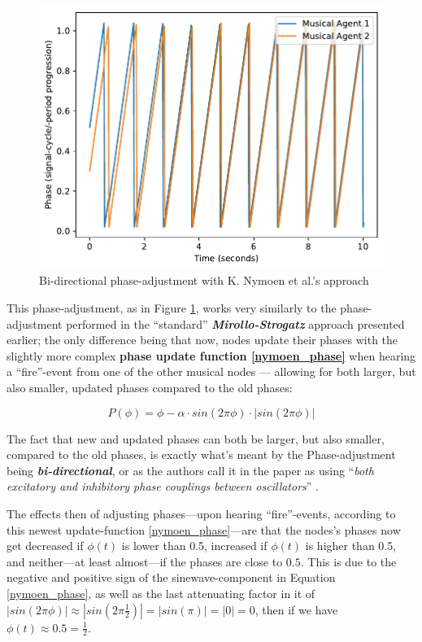 	\begin{figure}[h]
		\centering
		\includegraphics[width=0.9\linewidth]{Assets/Figures/NymoenPhaseAdjustment.pdf}
		\caption{Bi-directional phase-adjustment with K. Nymoen et al.'s approach}
		\label{fig:nymoen_phase}
	\end{figure}
	
	This phase-adjustment, as in Figure \ref{fig:nymoen_phase}, works very similarly to the phase-adjustment performed in the ``standard'' \textbf{\textit{Mirollo-Strogatz}} approach presented earlier; the only difference being that now, nodes update their phases with the slightly more complex \textbf{phase update function \eqref{nymoen_phase}} when hearing a ``fire''-event from one of the other musical nodes — allowing for both larger, but also smaller, updated phases compared to the old phases:
	
	\begin{equation}
	\label{nymoen_phase}
		P(\phi) = \phi - \alpha \cdot sin(2\pi\phi) \cdot | sin(2\pi\phi) |
	\end{equation}
	
	The fact that new and updated phases can both be larger, but also smaller, compared to the old phases, is exactly what's meant by the Phase-adjustment being \textbf{\textit{bi-directional}}, or as the authors call it in the paper as using ``\textit{both excitatory and inhibitory phase couplings between oscillators}'' \cite{nymoen_synch}.
	
	The effects then of adjusting phases—upon hearing ``fire''-events, according to this newest update-function \eqref{nymoen_phase}—are that the nodes's phases now get decreased if $\phi(t)$ is lower than 0.5, increased if $\phi(t)$ is higher than 0.5, and neither—at least almost—if the phases are close to $0.5$. This is due to the negative and positive sign of the sinewave-component in Equation \eqref{nymoen_phase}, as well as the last attenuating factor in it of $| sin(2\pi\phi) | \approx | sin(2\pi \frac{1}{2}) | = | sin(\pi) | = | 0 | = 0$, then if we have $\phi(t) \approx 0.5 = \frac{1}{2}$.

